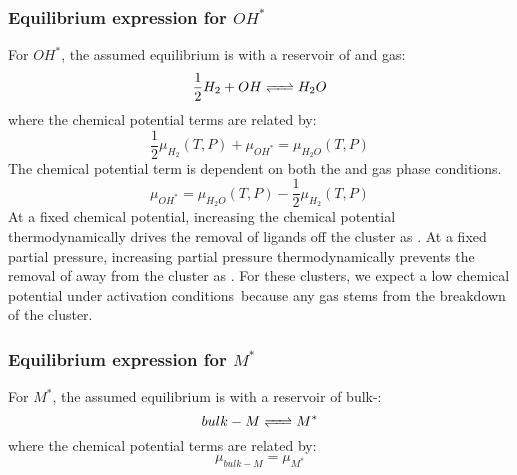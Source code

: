 \documentclass[12pt]{article}
\begin{document}
\subsubsection{Equilibrium expression for $OH^{*}$}
For $OH^{*}$, the assumed equilibrium is with a reservoir of  and  gas:
\begin{equation}
    \frac{1}{2} H_{2} + OH \ce{<=>} H_{2}O
\end{equation}
where the chemical potential terms are related by: 
\begin{equation}
    \frac{1}{2} \mu_{H_{2}}(T,P) + \mu_{OH^{*}} = \mu_{H_{2}O}(T,P) 
\end{equation}
The  chemical potential term is dependent on both the  and  gas phase conditions. 
\begin{equation}
    \mu_{OH^{*}} = \mu_{H_{2}O}(T,P) - \frac{1}{2} \mu_{H_{2}}(T,P)    
\end{equation}
At a fixed  chemical potential, increasing the  chemical potential thermodynamically drives the removal of  ligands off the cluster as . At a fixed  partial pressure, increasing  partial pressure thermodynamically prevents the removal of  away from the cluster as . For these  clusters, we expect a low  chemical potential under activation conditions\ because any  gas stems from the breakdown of the cluster. 

\subsubsection{Equilibrium expression for $M^{*}$}
For $M^{*}$, the assumed equilibrium is with a reservoir of bulk-:
\begin{equation}
    bulk-M \ce{<=>} M^{*}
\end{equation}
where the chemical potential terms are related by: 
\begin{equation}
    \mu_{bulk-M} = \mu_{M^{*}}
\end{equation}


\subsubsection{}
\end{document}
